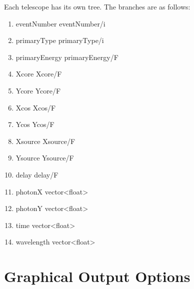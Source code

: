 \documentclass{article}
\begin{document}
Each telescope has its own tree. The branches are as follows:

\begin{enumerate}
 \setlength{\itemsep}{0cm}%
 \setlength{\parskip}{0cm}%

 \item
eventNumber eventNumber/i
 \item
primaryType primaryType/i
 \item
primaryEnergy primaryEnergy/F
 \item
Xcore Xcore/F
 \item
Ycore Ycore/F
 \item
Xcos Xcos/F
 \item
Ycos Ycos/F
 \item
Xsource Xsource/F
 \item
Ysource Ysource/F
 \item
delay delay/F
 \item
photonX vector<float>
 \item
photonY vector<float>
 \item
time vector<float>
 \item
wavelength vector<float>

\end{enumerate}

\section{Graphical Output Options}\label{S:GRAPH}
\end{document}

